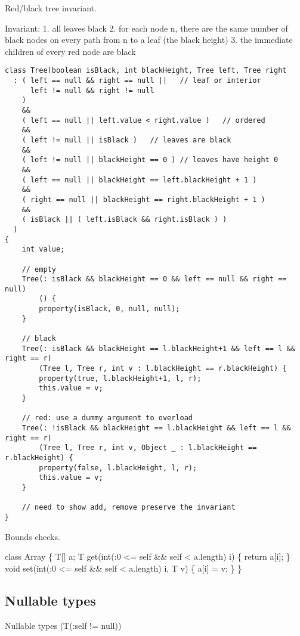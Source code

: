Red/black tree invariant.

Invariant:
1. all leaves black
2. for each node n, there are the same number of black nodes on
every path from n to a leaf (the black height)
3. the immediate children of every red node are black

\begin{verbatim}
class Tree(boolean isBlack, int blackHeight, Tree left, Tree right
  : ( left == null && right == null ||   // leaf or interior
      left != null && right != null
    )
    &&
    ( left == null || left.value < right.value )   // ordered
    &&
    ( left != null || isBlack )   // leaves are black
    &&
    ( left != null || blackHeight == 0 ) // leaves have height 0
    &&
    ( left == null || blackHeight == left.blackHeight + 1 )
    &&
    ( right == null || blackHeight == right.blackHeight + 1 )
    &&
    ( isBlack || ( left.isBlack && right.isBlack ) )
  )
{
    int value;

    // empty
    Tree(: isBlack && blackHeight == 0 && left == null && right == null)
        () {
        property(isBlack, 0, null, null);
    }

    // black
    Tree(: isBlack && blackHeight == l.blackHeight+1 && left == l && right == r)
        (Tree l, Tree r, int v : l.blackHeight == r.blackHeight) {
        property(true, l.blackHeight+1, l, r);
        this.value = v;
    }
       
    // red: use a dummy argument to overload
    Tree(: !isBlack && blackHeight == l.blackHeight && left == l && right == r)
        (Tree l, Tree r, int v, Object _ : l.blackHeight == r.blackHeight) {
        property(false, l.blackHeight, l, r);
        this.value = v;
    }

    // need to show add, remove preserve the invariant
}
\end{verbatim}

Bounds checks.

\begin{code}
class Array \{
    T[] a;
    T get(int(:0 <= self \&\& self < a.length) i) \{ return a[i]; \}
    void set(int(:0 <= self \&\& self < a.length) i, T v) \{ a[i] = v; \}
\}
\end{code}

\subsection{Nullable types}

Nullable types (T(:self != null))

